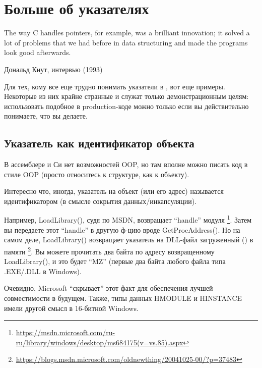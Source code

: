 \section{Больше об указателях}
\myindex{\CLanguageElements!\Pointers}
\label{label_pointers}

\epigraph{The way C handles pointers, for example, was a brilliant innovation;
it solved a lot of problems that we had before in data structuring and
made the programs look good afterwards.}{Дональд Кнут, интервью (1993)}

Для тех, кому все еще трудно понимать указатели в \CCpp{}, вот еще примеры.
Некоторые из них крайне странные и служат только демонстрационным целям:
использовать подобное в production-коде можно только если вы действительно понимаете, что вы делаете.








\subsection{Указатель как идентификатор объекта}

В ассемблере и Си нет возможностей \ac{OOP}, но там вполне можно писать код в стиле \ac{OOP}
(просто относитесь к структуре, как к объекту).

Интересно что, иногда, указатель на объект (или его адрес) называется идентификатором (в смысле сокрытия данных/инкапсуляции).

Например, LoadLibrary(), судя по \ac{MSDN}, возвращает ``handle'' модуля
\footnote{\url{https://msdn.microsoft.com/ru-ru/library/windows/desktop/ms684175(v=vs.85).aspx}}.
Затем вы передаете этот ``handle'' в другую ф-цию вроде GetProcAddress().
Но на самом деле, LoadLibrary() возвращает указатель на DLL-файл загруженный () в памяти
\footnote{\url{https://blogs.msdn.microsoft.com/oldnewthing/20041025-00/?p=37483}}.
Вы можете прочитать два байта по адресу возвращенному LoadLibrary(), и это будет ``MZ'' (первые два байта любого файла
типа .EXE/.DLL в Windows).

Очевидно, Microsoft ``скрывает'' этот факт для обеспечения лучшей совместимости в будущем.
Также, типы данных HMODULE и HINSTANCE имели другой смысл в 16-битной Windows.

